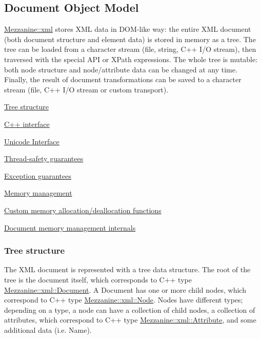 \par
 \par
 \hypertarget{XMLManual_XMLDOM}{}\subsection{Document Object Model}\label{XMLManual_XMLDOM}
\hyperlink{namespaceMezzanine_1_1xml}{Mezzanine::xml} stores XML data in DOM-\/like way: the entire XML document (both document structure and element data) is stored in memory as a tree. The tree can be loaded from a character stream (file, string, C++ I/O stream), then traversed with the special API or XPath expressions. The whole tree is mutable: both node structure and node/attribute data can be changed at any time. Finally, the result of document transformations can be saved to a character stream (file, C++ I/O stream or custom transport).
\begin{DoxyItemize}
\item \hyperlink{XMLManual_XMLTreeStructure}{Tree structure}
\item \hyperlink{XMLManual_XMLInterface}{C++ interface}
\item \hyperlink{XMLManual_XMLUnicode}{Unicode Interface}
\item \hyperlink{XMLManual_XMLThreadSafety}{Thread-\/safety guarantees}
\item \hyperlink{XMLManual_XMLExceptionSafety}{Exception guarantees}
\item \hyperlink{XMLManual_XMLMemory}{Memory management}
\begin{DoxyItemize}
\item \hyperlink{XMLManual_XMLCustomAlloc}{Custom memory allocation/deallocation functions}
\item \hyperlink{XMLManual_XMLMemoryInternals}{Document memory management internals}
\end{DoxyItemize}
\end{DoxyItemize}\hypertarget{XMLManual_XMLTreeStructure}{}\subsubsection{Tree structure}\label{XMLManual_XMLTreeStructure}
The XML document is represented with a tree data structure. The root of the tree is the document itself, which corresponds to C++ type \hyperlink{classMezzanine_1_1xml_1_1Document}{Mezzanine::xml::Document}. A Document has one or more child nodes, which correspond to C++ type \hyperlink{classMezzanine_1_1xml_1_1Node}{Mezzanine::xml::Node}. Nodes have different types; depending on a type, a node can have a collection of child nodes, a collection of attributes, which correspond to C++ type \hyperlink{classMezzanine_1_1xml_1_1Attribute}{Mezzanine::xml::Attribute}, and some additional data (i.e. Name). \par
